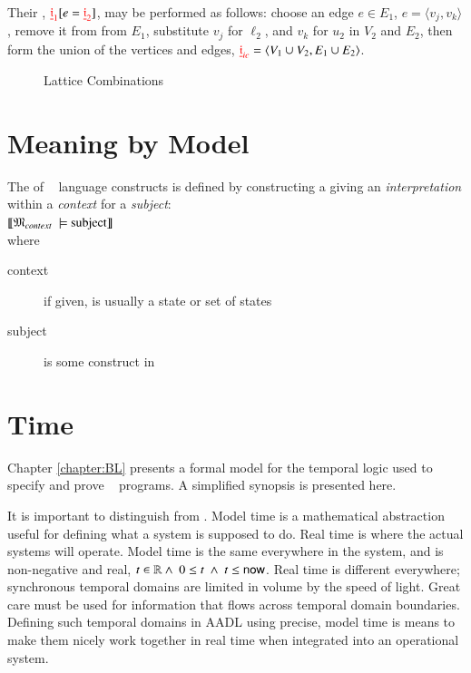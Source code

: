 \pn Their , $ {\color{red}\underline{\mathbf{\mathfrak{i}}}_{1}}[e= {\color{red}\underline{\mathbf{\mathfrak{i}}}_{2}}]$,
 may be performed as follows:  
choose an edge $e\in E_1$, $e=\langle v_{j},v_{k}\rangle$,
remove it from from $E_1$,
substitute $v_j$ for $\ell_2$, and $v_k$ for $u_2$ in $V_2$ and $E_2$,
then form the union of the vertices and edges, $ {\color{red}\underline{\mathbf{\mathfrak{i}}}_{ic}}=\langle V_{1}\cup V_{2},E_{1}\cup E_{2}\rangle$.


\begin{figure}
\caption{Lattice Combinations} %
\label{fig:latticecombinations}
\end{figure}

\section{Meaning by Model}\label{sec:meaning}

\pn The  of \lang~ language constructs is defined by constructing a  giving an \emph{interpretation} 
within a \emph{context} for a \emph{subject}: \\
\(\llbracket\mathfrak{M}_{context}~\models~$subject$\rrbracket\) \\
where  %
\begin{description}
	\item[context] if given, is usually a state or set of states
	\item[subject] is some construct in \lang~
\end{description}

\section{Time}\label{sec:timemodel}

\pn Chapter \ref{chapter:BL} presents a formal model for the temporal logic used to specify and prove \lang~ programs.  A simplified synopsis is presented here.

\pn It is important to distinguish  from .  
Model time is a mathematical abstraction useful for defining what a system is supposed to do.
Real time is where the actual systems will operate.
Model time is the same everywhere in the system, and is non-negative and real, 
$t\in\mathbb{R}\wedge~0\leq t~\wedge~t\leq \operatorname*{\mathsf{now}}$.
Real time is different everywhere; synchronous temporal domains are limited in volume by the speed of light.
Great care must be used for information that flows across temporal domain boundaries.
Defining such temporal domains in AADL using precise, model time is means to make them nicely work together in real time when integrated into an operational system.

